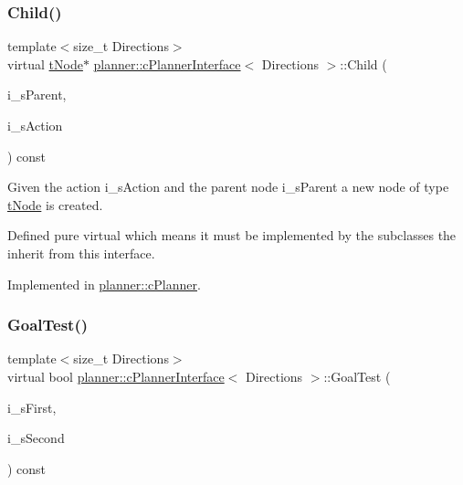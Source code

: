 \subsubsection{\texorpdfstring{Child()}{Child()}}
{\footnotesize\ttfamily template$<$size\+\_\+t Directions$>$ \\
virtual \mbox{\hyperlink{structplanner_1_1t_node}{t\+Node}}$\ast$ \mbox{\hyperlink{classplanner_1_1c_planner_interface}{planner\+::c\+Planner\+Interface}}$<$ Directions $>$\+::Child (\begin{DoxyParamCaption}\item[{\mbox{\hyperlink{structplanner_1_1t_node}{t\+Node}} $\ast$}]{i\+\_\+s\+Parent,  }\item[{const \mbox{\hyperlink{structplanner_1_1t_action}{t\+Action}} \&}]{i\+\_\+s\+Action }\end{DoxyParamCaption}) const\hspace{0.3cm}{\ttfamily [pure virtual]}}



Given the action i\+\_\+s\+Action and the parent node i\+\_\+s\+Parent a new node of type \mbox{\hyperlink{structplanner_1_1t_node}{t\+Node}} is created. 

Defined pure virtual which means it must be implemented by the subclasses the inherit from this interface. 

Implemented in \mbox{\hyperlink{classplanner_1_1c_planner_a7ddb18b161e5d59cfe733bce32c31896}{planner\+::c\+Planner}}.

\mbox{\label{classplanner_1_1c_planner_interface_aadc6ccb9088f755bd0ec30046bb79e99}} 
\subsubsection{\texorpdfstring{Goal\+Test()}{GoalTest()}}
{\footnotesize\ttfamily template$<$size\+\_\+t Directions$>$ \\
virtual bool \mbox{\hyperlink{classplanner_1_1c_planner_interface}{planner\+::c\+Planner\+Interface}}$<$ Directions $>$\+::Goal\+Test (\begin{DoxyParamCaption}\item[{const \mbox{\hyperlink{structplanner_1_1t_node}{t\+Node}} $\ast$}]{i\+\_\+s\+First,  }\item[{const \mbox{\hyperlink{structplanner_1_1t_node}{t\+Node}} $\ast$}]{i\+\_\+s\+Second }\end{DoxyParamCaption}) const\hspace{0.3cm}{\ttfamily [pure virtual]}}



